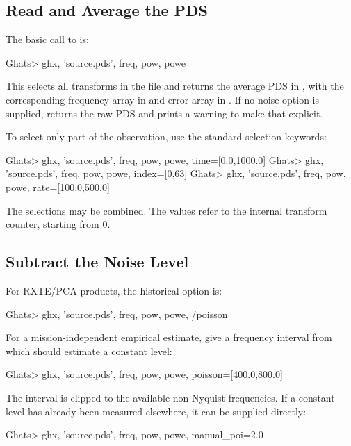 \subsection*{Read and Average the PDS}

The basic call to  is:

\begin{ghatsconsole}
Ghats> ghx, 'source.pds', freq, pow, powe
\end{ghatsconsole}

This selects all transforms in the file and returns the average PDS in
, with the corresponding frequency array in  and error
array in .  If no noise option is supplied,  returns
the raw PDS and prints a warning to make that explicit.

To select only part of the observation, use the standard selection keywords:

\begin{ghatsconsole}
Ghats> ghx, 'source.pds', freq, pow, powe, time=[0.0,1000.0]
Ghats> ghx, 'source.pds', freq, pow, powe, index=[0,63]
Ghats> ghx, 'source.pds', freq, pow, powe, rate=[100.0,500.0]
\end{ghatsconsole}

The selections may be combined.  The  values refer to the
internal transform counter, starting from 0.

\subsection*{Subtract the Noise Level}

For RXTE/PCA products, the historical option is:

\begin{ghatsconsole}
Ghats> ghx, 'source.pds', freq, pow, powe, /poisson
\end{ghatsconsole}

For a mission-independent empirical estimate, give a frequency interval from
which  should estimate a constant level:

\begin{ghatsconsole}
Ghats> ghx, 'source.pds', freq, pow, powe, poisson=[400.0,800.0]
\end{ghatsconsole}

The interval is clipped to the available non-Nyquist frequencies.  If a
constant level has already been measured elsewhere, it can be supplied
directly:

\begin{ghatsconsole}
Ghats> ghx, 'source.pds', freq, pow, powe, manual_poi=2.0
\end{ghatsconsole}

